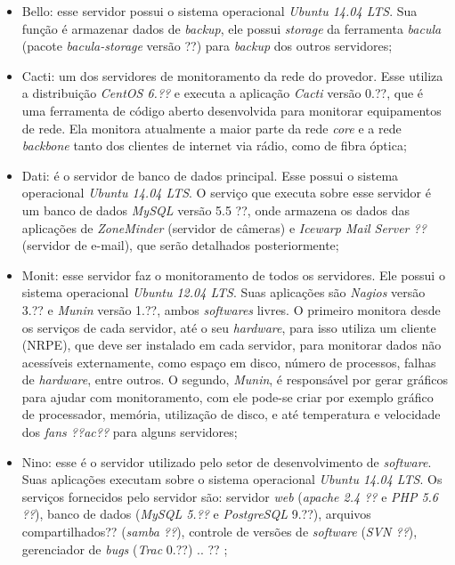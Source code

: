 \begin{itemize}
 \item Bello: esse servidor possui o sistema operacional \textit{Ubuntu 14.04 \ac{LTS}}. Sua função é armazenar dados de \textit{backup}, ele 
 possui \textit{storage} da ferramenta \textit{bacula} (pacote \textit{bacula-storage} versão ??) para \textit{backup} dos outros servidores;
 
 \item Cacti: um dos servidores de monitoramento da rede do provedor. Esse utiliza a distribuição \textit{CentOS 6.??} e executa a aplicação
 \textit{Cacti} versão 0.??, que é uma ferramenta de código aberto desenvolvida para monitorar equipamentos de rede. Ela monitora atualmente a 
 maior parte da rede \textit{core} e a rede \textit{backbone} tanto dos clientes de internet via rádio, como de fibra óptica;
 
 \item Dati: é o servidor de banco de dados principal. Esse possui o sistema operacional \textit{Ubuntu 14.04 \ac{LTS}}. O serviço que executa
 sobre esse servidor é um banco de dados \textit{MySQL} versão 5.5 ??, onde armazena os dados das aplicações de \textit{ZoneMinder} (servidor 
 de câmeras) e \textit{Icewarp Mail Server ??} (servidor de e-mail), que serão detalhados posteriormente;
 
 \item Monit: esse servidor faz o monitoramento de todos os servidores. Ele possui o sistema operacional \textit{Ubuntu 12.04 \ac{LTS}}.
 Suas aplicações são \textit{Nagios} versão 3.?? e \textit{Munin} versão 1.??, ambos \textit{softwares} livres. O primeiro monitora desde os 
 serviços de cada servidor, até o seu \textit{hardware}, para isso utiliza um cliente (\ac{NRPE}), que deve ser instalado em cada servidor, para 
 monitorar dados não acessíveis externamente, como espaço em disco, número de processos, falhas de \textit{hardware}, entre outros. O segundo, 
 \textit{Munin}, é responsável por gerar gráficos para ajudar com monitoramento, com ele pode-se criar por exemplo gráfico de processador, 
 memória, utilização de disco, e até temperatura e velocidade dos \textit{fans ??ac??} para alguns servidores;
 
 \item Nino: esse é o servidor utilizado pelo setor de desenvolvimento de \textit{software}. Suas aplicações executam sobre o sistema operacional
 \textit{Ubuntu 14.04 \ac{LTS}}. Os serviços fornecidos pelo servidor são: servidor \textit{web} (\textit{apache 2.4 ??} e 
 \textit{\ac{PHP} 5.6 ??}), banco de dados (\textit{MySQL 5.??} e \textit{PostgreSQL} 9.??), arquivos compartilhados?? (\textit{samba ??}), 
 controle de versões de \textit{software} (\textit{\ac{SVN} ??}), gerenciador de \textit{bugs} (\textit{Trac} 0.??) .. ?? ;
 

\end{itemize}
